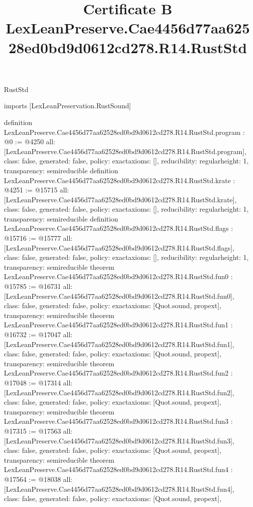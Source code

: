 \begin{lexlean}{RustStd}
\title{Certificate B LexLeanPreserve.Cae4456d77aa62528ed0bd9d0612cd278.R14.RustStd}
\begin{coremodule}
imports [LexLeanPreservation.RustSound]

definition LexLeanPreserve.Cae4456d77aa62528ed0bd9d0612cd278.R14.RustStd.program : @0 := @4250 {
  all: [LexLeanPreserve.Cae4456d77aa62528ed0bd9d0612cd278.R14.RustStd.program],
  class: false,
  generated: false,
  policy: exact{axioms: []},
  reducibility: regular{height: 1},
  transparency: semireducible
}
definition LexLeanPreserve.Cae4456d77aa62528ed0bd9d0612cd278.R14.RustStd.krate : @4251 := @15715 {
  all: [LexLeanPreserve.Cae4456d77aa62528ed0bd9d0612cd278.R14.RustStd.krate],
  class: false,
  generated: false,
  policy: exact{axioms: []},
  reducibility: regular{height: 1},
  transparency: semireducible
}
definition LexLeanPreserve.Cae4456d77aa62528ed0bd9d0612cd278.R14.RustStd.flags : @15716 := @15777 {
  all: [LexLeanPreserve.Cae4456d77aa62528ed0bd9d0612cd278.R14.RustStd.flags],
  class: false,
  generated: false,
  policy: exact{axioms: []},
  reducibility: regular{height: 1},
  transparency: semireducible
}
theorem LexLeanPreserve.Cae4456d77aa62528ed0bd9d0612cd278.R14.RustStd.fun0 : @15785 := @16731 {
  all: [LexLeanPreserve.Cae4456d77aa62528ed0bd9d0612cd278.R14.RustStd.fun0],
  class: false,
  generated: false,
  policy: exact{axioms: [Quot.sound, propext]},
  transparency: semireducible
}
theorem LexLeanPreserve.Cae4456d77aa62528ed0bd9d0612cd278.R14.RustStd.fun1 : @16732 := @17047 {
  all: [LexLeanPreserve.Cae4456d77aa62528ed0bd9d0612cd278.R14.RustStd.fun1],
  class: false,
  generated: false,
  policy: exact{axioms: [Quot.sound, propext]},
  transparency: semireducible
}
theorem LexLeanPreserve.Cae4456d77aa62528ed0bd9d0612cd278.R14.RustStd.fun2 : @17048 := @17314 {
  all: [LexLeanPreserve.Cae4456d77aa62528ed0bd9d0612cd278.R14.RustStd.fun2],
  class: false,
  generated: false,
  policy: exact{axioms: [Quot.sound, propext]},
  transparency: semireducible
}
theorem LexLeanPreserve.Cae4456d77aa62528ed0bd9d0612cd278.R14.RustStd.fun3 : @17315 := @17563 {
  all: [LexLeanPreserve.Cae4456d77aa62528ed0bd9d0612cd278.R14.RustStd.fun3],
  class: false,
  generated: false,
  policy: exact{axioms: [Quot.sound, propext]},
  transparency: semireducible
}
theorem LexLeanPreserve.Cae4456d77aa62528ed0bd9d0612cd278.R14.RustStd.fun4 : @17564 := @18038 {
  all: [LexLeanPreserve.Cae4456d77aa62528ed0bd9d0612cd278.R14.RustStd.fun4],
  class: false,
  generated: false,
  policy: exact{axioms: [Quot.sound, propext]},
}
\end{coremodule}
\end{lexlean}
